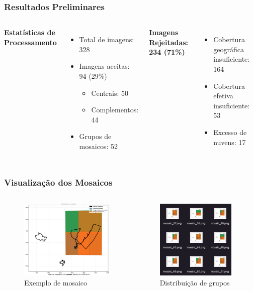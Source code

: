 \documentclass{beamer}
\begin{document}
\begin{frame}
    \frametitle{Resultados Preliminares}
    \begin{columns}
        \textbf{Estatísticas de Processamento}
        \begin{itemize}
            \item Total de imagens: 328
            \item Imagens aceitas: 94 (29\%)
            \begin{itemize}
                \item Centrais: 50
                \item Complementos: 44
            \end{itemize}
            \item Grupos de mosaicos: 52
        \end{itemize}
        
        \textbf{Imagens Rejeitadas: 234 (71\%)}
        \begin{itemize}
            \item Cobertura geográfica insuficiente: 164
            \item Cobertura efetiva insuficiente: 53
            \item Excesso de nuvens: 17
        \end{itemize}
    \end{columns}
\end{frame}

\begin{frame}
    \frametitle{Visualização dos Mosaicos}
    \begin{columns}
        \begin{figure}
            \includegraphics[width=\linewidth,height=3.8cm,keepaspectratio]{images/mosaico.png}
            \caption{\footnotesize Exemplo de mosaico}
        \end{figure}
        
        \begin{figure}
            \includegraphics[width=\linewidth,height=3.8cm,keepaspectratio]{images/mosaicos.png}
            \caption{\footnotesize Distribuição de grupos}
        \end{figure}
    \end{columns}
\end{frame}
\end{document}
